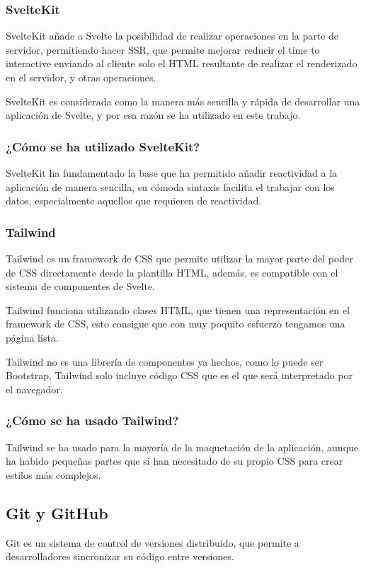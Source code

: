 \subsubsection{SvelteKit}
SvelteKit añade a Svelte la posibilidad de realizar operaciones en la parte de servidor, permitiendo hacer SSR, que permite mejorar reducir el time to interactive enviando al cliente solo el HTML resultante de realizar el renderizado en el servidor, y otras operaciones.

SvelteKit es considerada como la manera más sencilla y rápida de desarrollar una aplicación de Svelte, y por esa razón se ha utilizado en este trabajo.

\subsubsection{¿Cómo se ha utilizado SvelteKit?}
SvelteKit ha fundamentado la base que ha permitido añadir reactividad a la aplicación de manera sencilla, su cómoda sintaxis facilita el trabajar con los datos, especialmente aquellos que requieren de reactividad.

\subsubsection{Tailwind}
Tailwind \cite{tailwind_docs} es un framework de CSS que permite utilizar la mayor parte del poder de CSS directamente desde la plantilla HTML, además, es compatible con el sistema de componentes de Svelte.

Tailwind funciona utilizando clases HTML, que tienen una representación en el framework de CSS, esto consigue que con muy poquito esfuerzo tengamos una página lista.

Tailwind no es una librería de componentes ya hechos, como lo puede ser Bootstrap, Tailwind solo incluye código CSS que es el que será interpretado por el navegador.

\subsubsection{¿Cómo se ha usado Tailwind?}
Tailwind se ha usado para la mayoría de la maquetación de la aplicación, aunque ha habido pequeñas partes que si han necesitado de su propio CSS para crear estilos más complejos.

\subsection{Git y GitHub}
Git es un sistema de control de versiones distribuido, que permite a desarrolladores sincronizar su código entre versiones.

